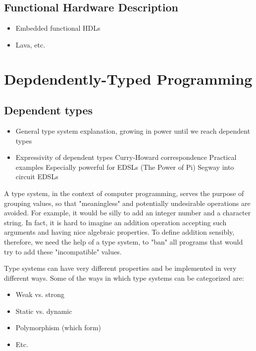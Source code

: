 \documentclass[a4paper]{article}
\begin{document}
        \subsection{Functional Hardware Description}
        \label{subsec:functional-hardware}
            \begin{itemize}
                \item Embedded functional HDLs
                \item Lava, etc.
            \end{itemize}


    \section{Depdendently-Typed Programming}
    \label{sec:dtp}

        \subsection{Dependent types}
        \label{subsec:dependent-types}
            \begin{itemize}
                \item General type system explanation, growing in power until we reach dependent types
                \item Expressivity of dependent types
                    \subitem Curry-Howard correspondence
                    \subitem Practical examples
                        \subsubitem Especially powerful for EDSLs (The Power of Pi)
                        \subsubitem Segway into circuit EDSLs
            \end{itemize}

            A type system, in the context of computer programming,
            serves the purpose of grouping values, so that "meaningless" and potentially undesirable operations are avoided.
            For example, it would be silly to add an integer number and a character string.
            In fact, it is hard to imagine an addition operation accepting such arguments and having nice algebraic properties.
            To define addition sensibly, therefore, we need the help of a type system, to "ban" all programs that would
            try to add these "incompatible" values.

            Type systems can have very different properties and be implemented in very different ways.
            Some of the ways in which type systems can be categorized are:
            \begin{itemize}
                \item Weak vs. strong
                \item Static vs. dynamic
                \item Polymorphism (which form)
                \item Etc.
            \end{itemize}
\end{document}
